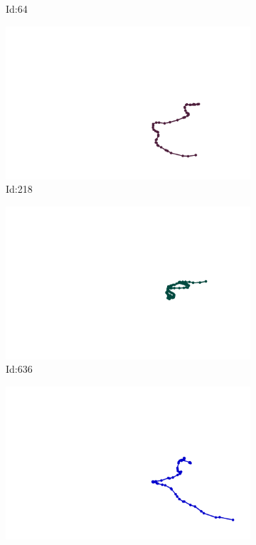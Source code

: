 \documentclass[12pt,twoside]{report}
\begin{document}
\begin{figure}
\begin{subfigure}[b]{0.20\textwidth}
\caption{Id:64}
\end{subfigure}
\begin{subfigure}[b]{0.20\textwidth}
\centering
\includegraphics[width=\textwidth]{../../trajectories/218.png}
\caption{Id:218}
\end{subfigure}
\begin{subfigure}[b]{0.20\textwidth}
\centering
\includegraphics[width=\textwidth]{../../trajectories/636.png}
\caption{Id:636}
\end{subfigure}
\begin{subfigure}[b]{0.20\textwidth}
\centering
\includegraphics[width=\textwidth]{../../trajectories/679.png}

\end{subfigure}
\end{figure}
\end{document}
